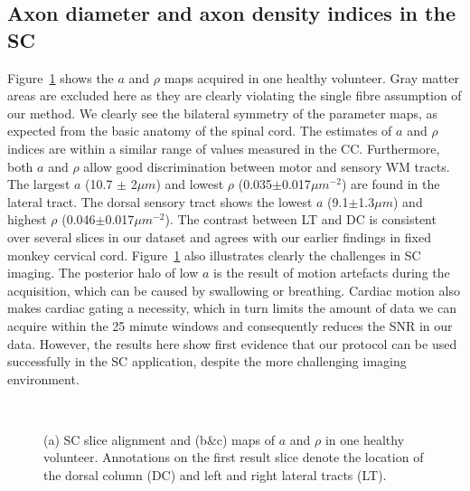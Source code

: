 \subsection*{Axon diameter and axon density indices in the SC}
Figure~\ref{fig:chap 9 SC results} shows the $a$ and $\rho$ maps acquired in one healthy volunteer. Gray matter areas are excluded here as they are clearly violating the single fibre assumption of our method.  We clearly see the bilateral symmetry of the parameter maps, as expected from the basic anatomy of the spinal cord. The estimates of $a$ and $\rho$ indices are within a similar range of values measured in the \gls{CC}. Furthermore, both $a$ and $\rho$ allow good discrimination between motor and sensory WM tracts. The largest $a$ (10.7 $\pm$ 2$\mu m$) and lowest $\rho$ (0.035$\pm$0.017$\mu m^{-2}$) are found in the lateral tract. The dorsal sensory tract shows the lowest $a$ (9.1$\pm$1.3$\mu m$) and highest $\rho$ (0.046$\pm$0.017$\mu m^{-2}$). The contrast between LT and DC is consistent over several slices in our dataset and agrees with our earlier findings in fixed monkey cervical cord. Figure~\ref{fig:chap 9 SC results} also illustrates clearly the challenges in SC imaging. The posterior halo of low $a$ is the result of motion artefacts during the acquisition, which can be caused by swallowing or breathing. Cardiac motion also makes cardiac gating a necessity, which in turn limits the amount of data we can acquire within the 25 minute windows and consequently reduces the \gls{SNR} in our data. However, the results here show first evidence that our \SFasym{} protocol can be used successfully in the SC application, despite the more challenging imaging environment.
\begin{figure}[ht]
	\centering
	\begin{minipage}{0.39\textwidth}
	\end{minipage}
	\begin{minipage}{0.59\textwidth}
			\\
	\end{minipage}
	\caption{(a) SC slice alignment  and  (b\&c) maps of $a$ and $\rho$ in one healthy volunteer. Annotations on the first result slice denote the location of the dorsal column (DC) and left and right lateral tracts (LT).}
	\label{fig:chap 9 SC results}
\end{figure}

